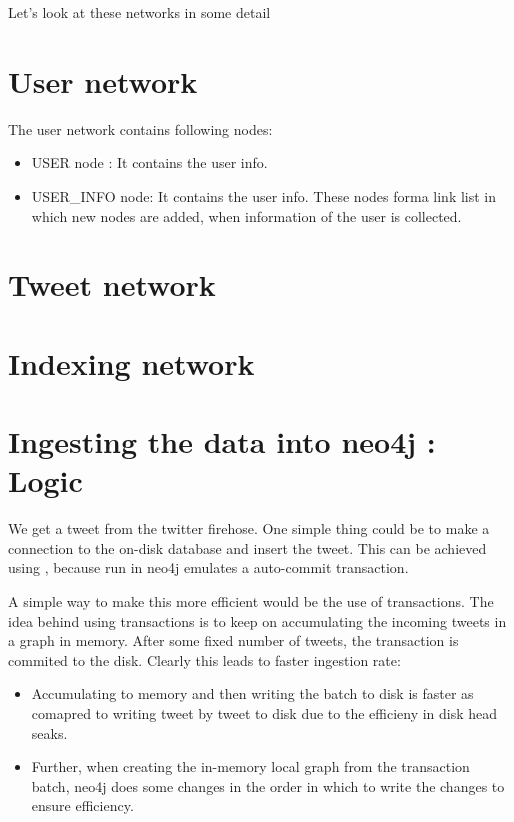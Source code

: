 \documentclass[letterpaper,10pt,english]{sphinxmanual}
\begin{document}
Let’s look at these networks in some detail


\section{User network}
\label{\detokenize{neo4j_data_ingestion:user-network}}
The user network contains following nodes:
\begin{itemize}
\item {} 
USER node : It contains the user info.

\item {} 
USER\_INFO node: It contains the user info. These nodes forma link list in which new nodes are added, when information of the user is collected.

\end{itemize}

\noindent{}

\noindent{}


\section{Tweet network}
\label{\detokenize{neo4j_data_ingestion:tweet-network}}
\noindent{}


\section{Indexing network}
\label{\detokenize{neo4j_data_ingestion:indexing-network}}
\noindent{}


\section{Ingesting the data into neo4j : Logic}
\label{\detokenize{neo4j_data_ingestion:ingesting-the-data-into-neo4j-logic}}
We get a tweet from the twitter firehose. One simple thing could be to make a connection to the on-disk database and insert the tweet. This can be achieved using , because run in neo4j emulates a auto-commit transaction.

A simple way to make this more efficient would be the use of transactions. The idea behind using transactions is to keep on accumulating the incoming tweets in a graph in memory. After some fixed number of tweets, the transaction is commited to the disk. Clearly this leads to faster ingestion rate:
\begin{itemize}
\item {} 
Accumulating to memory and then writing the batch to disk is faster as comapred to writing tweet by tweet to disk due to the efficieny in disk head seaks.

\item {} 
Further, when creating the in-memory local graph from the transaction batch, neo4j does some changes in the order in which to write the changes to ensure efficiency.

\end{itemize}
\end{document}
